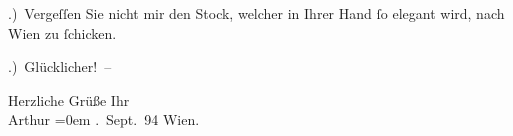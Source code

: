 .) Vergeſſen Sie nicht mir den Stock, welcher in Ihrer Hand{ }ſo elegant wird, nach
                  Wien zu{ }ſchicken.\pend
           
.) Glücklicher! –\pend
           
\pstart
           Herzliche Grüße Ihr{\\[\baselineskip]}\spacefill\mbox{Arthur}\pend
           \leftskip=0em{}
. Sept. 94{ }Wien.\pend
           \endnumbering{}  \newcommand{\dateiname}{L00368}\newcommand{\titel}{Arthur Schnitzler an Richard Beer-Hofmann, 9. 9. 1894}\newcommand{\editorInnen}{Herausgegeben von Martin Anton Müller}
